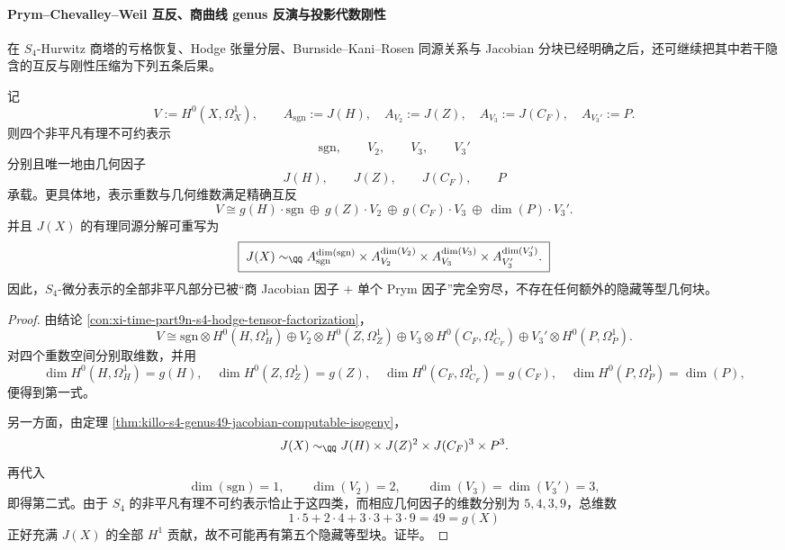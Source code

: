 \paragraph{Prym--Chevalley--Weil 互反、商曲线 genus 反演与投影代数刚性}
在 \(S_4\)-Hurwitz 商塔的亏格恢复、Hodge 张量分层、Burnside--Kani--Rosen 同源关系与 Jacobian 分块已经明确之后，还可继续把其中若干隐含的互反与刚性压缩为下列五条后果。

\begin{theorem}\label{thm:xi-time-part9n1b-prym-chevalley-weil-reciprocity}
记
\[
V:=H^0(X,\Omega_X^1),
\qquad
A_{\mathrm{sgn}}:=J(H),\quad
A_{V_2}:=J(Z),\quad
A_{V_3}:=J(C_F),\quad
A_{V_3'}:=P.
\]
则四个非平凡有理不可约表示
\[
\mathrm{sgn},\qquad V_2,\qquad V_3,\qquad V_3'
\]
分别且唯一地由几何因子
\[
J(H),\qquad J(Z),\qquad J(C_F),\qquad P
\]
承载。更具体地，表示重数与几何维数满足精确互反
\[
\boxed{\;
V\cong
g(H)\cdot \mathrm{sgn}\ \oplus\
g(Z)\cdot V_2\ \oplus\
g(C_F)\cdot V_3\ \oplus\
\dim(P)\cdot V_3'.\;}
\]
并且 \(J(X)\) 的有理同源分解可重写为
\[
\boxed{\;
J(X)\sim_{\QQ}
A_{\mathrm{sgn}}^{\dim(\mathrm{sgn})}\times
A_{V_2}^{\dim(V_2)}\times
A_{V_3}^{\dim(V_3)}\times
A_{V_3'}^{\dim(V_3')}. \;}
\]
因此，\(S_4\)-微分表示的全部非平凡部分已被“商 Jacobian 因子 \(+\) 单个 Prym 因子”完全穷尽，不存在任何额外的隐藏等型几何块。
\end{theorem}
\begin{proof}
由结论 \ref{con:xi-time-part9n-s4-hodge-tensor-factorization}，
\[
V\cong
\mathrm{sgn}\otimes H^0(H,\Omega_H^1)
\oplus
V_2\otimes H^0(Z,\Omega_Z^1)
\oplus
V_3\otimes H^0(C_F,\Omega_{C_F}^1)
\oplus
V_3'\otimes H^0(P,\Omega_P^1).
\]
对四个重数空间分别取维数，并用
\[
\dim H^0(H,\Omega_H^1)=g(H),\quad
\dim H^0(Z,\Omega_Z^1)=g(Z),\quad
\dim H^0(C_F,\Omega_{C_F}^1)=g(C_F),\quad
\dim H^0(P,\Omega_P^1)=\dim(P),
\]
便得到第一式。

另一方面，由定理 \ref{thm:killo-s4-genus49-jacobian-computable-isogeny}，
\[
J(X)\sim_{\QQ}J(H)\times J(Z)^2\times J(C_F)^3\times P^3.
\]
再代入
\[
\dim(\mathrm{sgn})=1,\qquad \dim(V_2)=2,\qquad \dim(V_3)=\dim(V_3')=3,
\]
即得第二式。由于 \(S_4\) 的非平凡有理不可约表示恰止于这四类，而相应几何因子的维数分别为 \(5,4,3,9\)，总维数
\[
1\cdot 5+2\cdot 4+3\cdot 3+3\cdot 9=49=g(X)
\]
正好充满 \(J(X)\) 的全部 \(H^1\) 贡献，故不可能再有第五个隐藏等型块。证毕。
\end{proof}


